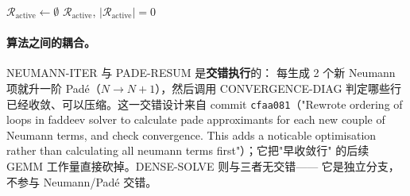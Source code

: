\begin{algorithm}[H]
\caption{DENSE-SOLVE（基准用稠密 LAPACK 求解器，对应 \texttt{faddeev\_dense\_solver}）}
\label{alg:ch11-dense-solve}
\BlankLine
{}
\end{algorithm}

\begin{algorithm}[H]
\caption{CONVERGENCE-DIAG（收敛诊断与压缩行表）}
\label{alg:ch11-conv-diag}
\BlankLine
\(\mathcal{R}_{\text{active}} \leftarrow \emptyset\)\;
\Return \(\mathcal{R}_{\text{active}}\), \(|\mathcal{R}_{\text{active}}| = 0\)\;
\end{algorithm}

\paragraph{算法之间的耦合。}
NEUMANN-ITER 与 PADE-RESUM 是\textbf{交错执行}的：
每生成 2 个新 Neumann 项就升一阶 Padé（\(N\to N+1\)），然后调用
CONVERGENCE-DIAG 判定哪些行已经收敛、可以压缩。这一交错设计来自
commit \texttt{cfaa081}（"Rewrote ordering of loops in faddeev solver to
calculate pade approximants for each new couple of Neumann terms, and check
convergence. This adds a noticable optimisation rather than calculating all
neumann terms first"）；它把"早收敛行"
的后续 GEMM 工作量直接砍掉。DENSE-SOLVE 则与三者无交错——
它是独立分支，不参与 Neumann/Padé 交错。

